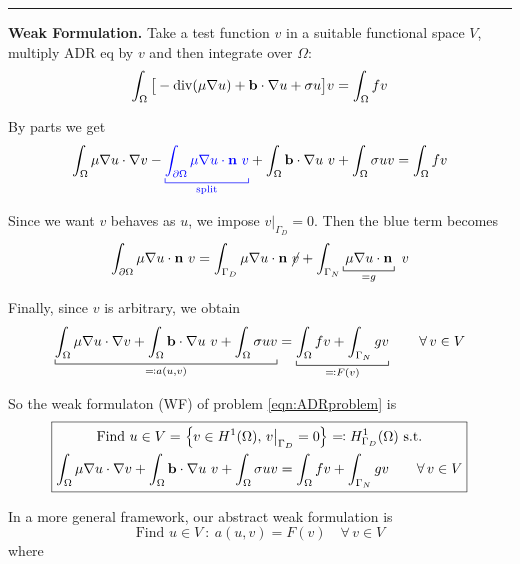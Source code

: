 \rule{0.47\textwidth}{0.2pt}

\smallskip

\textbf{Weak Formulation.} Take a test function $v$ in a suitable functional space $V$, multiply ADR eq by $v$ and then integrate over $\Omega$:
\begin{equation*}
\int_\Omega \big[-\operatorname{div}( \mu \nabla u )+\mathbf{b}\cdot\nabla u+\sigma u\big] v=\int_\Omega fv
\end{equation*}

By parts we get
\begin{equation*}
\int_\Omega \mu \nabla u \cdot \nabla v-{\color{blue} \underbracket[0.5pt]{\int_{\partial \Omega} \mu \nabla u\cdot \nv\ v}_{\text{split}} } + \int_\Omega \bv\cdot \nabla u\ v+ \int_\Omega \sigma u v = \int_\Omega fv
\end{equation*}

Since we want $v$ behaves as $u$, we impose $v\big|_{\Gamma_D}=0$. Then the blue term becomes
\begin{equation*}
\int_{\partial \Omega} \mu \nabla u\cdot \nv\ v = \int_{\Gamma_D} \mu \nabla u\cdot \nv\ \cancel{v}+\int_{\Gamma_N} \underbracket[0.5pt]{\,\mu \nabla u\cdot \nv\,}_{=g}\ v
\end{equation*}

Finally, since $v$ is arbitrary, we obtain
\begin{equation*}
\underbracket[0.5pt]{\int_\Omega \mu \nabla u \cdot \nabla v+ \int_\Omega \bv\cdot \nabla u\ v+ \int_\Omega \sigma u v}_{\eqcolon a(u,v)} = \underbracket[0.5pt]{\int_\Omega fv + \int_{\Gamma_N} gv}_{\eqcolon F(v)}\qquad \forall\, v\in V
\end{equation*}

So the weak formulaton (WF) of problem \eqref{eqn:ADRproblem} is
\begin{equation*}
\boxed{
    \begin{gathered}
    \text{Find }u\in V=\left\{ v\in H^1(\Omega),\,v\big|_{\Gamma_D}=0 \right\}\eqcolon H^1_{\Gamma_D}(\Omega)\text{ s.t.} \\
    \int_\Omega \mu \nabla u \cdot \nabla v+ \int_\Omega \mathbf{b}\cdot \nabla u\ v+ \int_\Omega \sigma u v = \int_\Omega fv + \int_{\Gamma_N} gv\qquad \forall\, v \in V
    \end{gathered}
}
\end{equation*}

In a more general framework, our abstract weak formulation is
\begin{equation*}
\boxed{\text{Find } u\in V\ :\ a(u,v)=F(v)\quad\forall\, v\in V} \tag{AWF}
\end{equation*}
where

